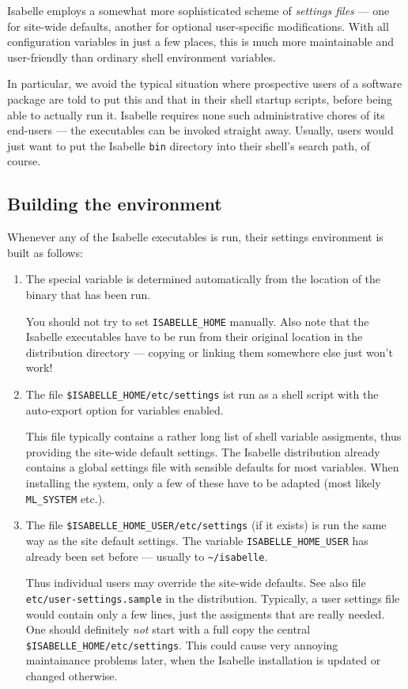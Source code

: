 Isabelle employs a somewhat more sophisticated scheme of
\emph{settings files} --- one for site-wide defaults, another for
optional user-specific modifications.  With all configuration
variables in just a few places, this is much more maintainable and
user-friendly than ordinary shell environment variables.

In particular, we avoid the typical situation where prospective users
of a software package are told to put this and that in their shell
startup scripts, before being able to actually run it. Isabelle
requires none such administrative chores of its end-users --- the
executables can be invoked straight away. Usually, users would just
want to put the Isabelle \texttt{bin} directory into their shell's
search path, of course.


\subsection{Building the environment}

Whenever any of the Isabelle executables is run, their settings
environment is built as follows:

\begin{enumerate}
\item The special variable  is determined
  automatically from the location of the binary that has been run.
  
  You should not try to set \texttt{ISABELLE_HOME} manually. Also note
  that the Isabelle executables have to be run from their original
  location in the distribution directory --- copying or linking them
  somewhere else just won't work!
  
\item The file \texttt{\$ISABELLE_HOME/etc/settings} ist run as a
  shell script with the auto-export option for variables enabled.
  
  This file typically contains a rather long list of shell variable
  assigments, thus providing the site-wide default settings.  The
  Isabelle distribution already contains a global settings file with
  sensible defaults for most variables. When installing the system,
  only a few of these have to be adapted (most likely
  \texttt{ML_SYSTEM} etc.).
  
\item The file \texttt{\$ISABELLE_HOME_USER/etc/settings} (if it
  exists) is run the same way as the site default settings. The
  variable \texttt{ISABELLE_HOME_USER} has already been set before ---
  usually to \texttt{\~\relax/isabelle}.
  
  Thus individual users may override the site-wide defaults. See also
  file \texttt{etc/user-settings.sample} in the distribution.
  Typically, a user settings file would contain only a few lines, just
  the assigments that are really needed.  One should definitely
  \emph{not} start with a full copy the central
  \texttt{\$ISABELLE_HOME/etc/settings}. This could cause very
  annoying maintainance problems later, when the Isabelle installation
  is updated or changed otherwise.

\end{enumerate}

